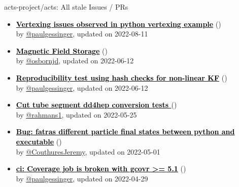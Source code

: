 \begin{frame}[allowframebreaks]{ acts-project/acts: All stale Issues / PRs}
\begin{itemize}
    \item\iss\prstale\textbf{\href{https://github.com/acts-project/acts/issues/1091}{\textcolor{black}{Vertexing issues observed in python vertexing example}}}
    (\href{https://github.com/acts-project/acts/issues/1091}{}) \\
    by \href{https://github.com/paulgessinger}{@paulgessinger}, updated on 2022-08-11

    \item\iss\prstale\textbf{\href{https://github.com/acts-project/acts/issues/1239}{\textcolor{black}{Magnetic Field Storage}}}
    (\href{https://github.com/acts-project/acts/issues/1239}{}) \\
    by \href{https://github.com/osbornjd}{@osbornjd}, updated on 2022-06-12

    \item\iss\prstale\textbf{\href{https://github.com/acts-project/acts/issues/1246}{\textcolor{black}{Reproducibility test using hash checks for non-linear KF}}}
    (\href{https://github.com/acts-project/acts/issues/1246}{}) \\
    by \href{https://github.com/paulgessinger}{@paulgessinger}, updated on 2022-06-12

    \item\iss\prstale\textbf{\href{https://github.com/acts-project/acts/issues/1146}{\textcolor{black}{Cut tube segment dd4hep conversion tests }}}
    (\href{https://github.com/acts-project/acts/issues/1146}{}) \\
    by \href{https://github.com/rahmans1}{@rahmans1}, updated on 2022-05-25

    \item\iss\prstale\textbf{\href{https://github.com/acts-project/acts/issues/1221}{\textcolor{black}{Bug: fatras different particle final states between python and executable}}}
    (\href{https://github.com/acts-project/acts/issues/1221}{}) \\
    by \href{https://github.com/CouthuresJeremy}{@CouthuresJeremy}, updated on 2022-05-01

    \item\iss\prstale\textbf{\href{https://github.com/acts-project/acts/issues/1211}{\textcolor{black}{ci: Coverage job is broken with gcovr \textgreater{}= 5.1}}}
    (\href{https://github.com/acts-project/acts/issues/1211}{}) \\
    by \href{https://github.com/paulgessinger}{@paulgessinger}, updated on 2022-04-29


\end{itemize}
\end{frame}
